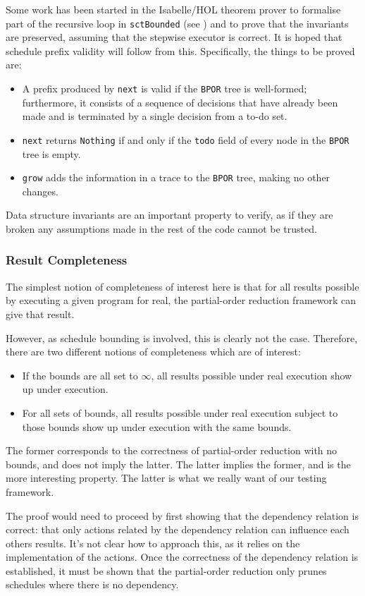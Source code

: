 Some work has been started in the Isabelle/HOL theorem prover to
formalise part of the recursive loop in \verb|sctBounded| (see
) and to prove that the invariants are preserved,
assuming that the stepwise executor is correct. It is hoped that
schedule prefix validity will follow from this. Specifically, the
things to be proved are:

\begin{itemize}
\item A prefix produced by \verb|next| is valid if the \verb|BPOR|
  tree is well-formed; furthermore, it consists of a sequence of
  decisions that have already been made and is terminated by a single
  decision from a to-do set.

\item \verb|next| returns \verb|Nothing| if and only if the
  \verb|todo| field of every node in the \verb|BPOR| tree is empty.

\item \verb|grow| adds the information in a trace to the \verb|BPOR|
  tree, making no other changes.
\end{itemize}

Data structure invariants are an important property to verify, as if
they are broken any assumptions made in the rest of the code cannot be
trusted.

\subsubsection{Result Completeness}
\label{sec:correctness-testing-complete}

The simplest notion of completeness of interest here is that for all
results possible by executing a given program for real, the
partial-order reduction framework can give that result.

However, as schedule bounding is involved, this is clearly not the
case. Therefore, there are two different notions of completeness which
are of interest:

\begin{itemize}
\item If the bounds are all set to $\infty$, all results possible
  under real execution show up under \dejafu{} execution.

\item For all sets of bounds, all results possible under real
  execution subject to those bounds show up under \dejafu{} execution
  with the same bounds.
\end{itemize}

The former corresponds to the correctness of partial-order reduction
with no bounds, and does not imply the latter. The latter implies the
former, and is the more interesting property. The latter is what we
really want of our testing framework.

The proof would need to proceed by first showing that the dependency
relation is correct: that only actions related by the dependency
relation can influence each others results. It's not clear how to
approach this, as it relies on the implementation of the actions. Once
the correctness of the dependency relation is established, it must be
shown that the partial-order reduction only prunes schedules where
there is no dependency.
